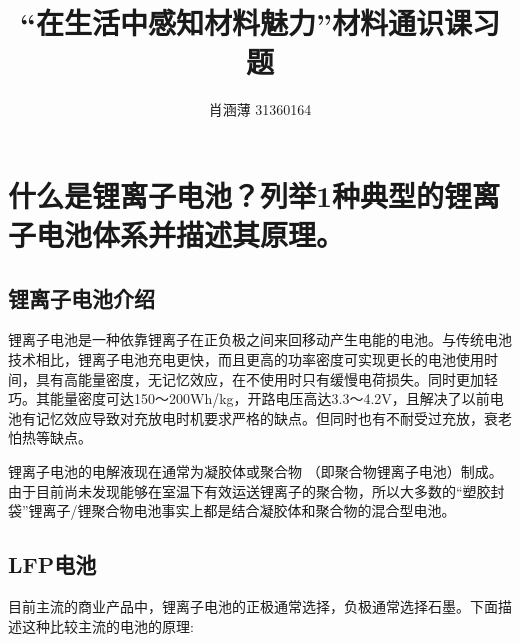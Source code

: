 \documentclass[UTF8,9pt]{ctexart}
\author{肖涵薄 31360164}
\title{“在生活中感知材料魅力”材料通识课习题}
\newcommand\se{\section}                                               %
\newcommand\sub{\subsection}                                           %
\begin{document}
 
\maketitle
\se{什么是锂离子电池？列举1种典型的锂离子电池体系并描述其原理。}
\sub{锂离子电池介绍}
锂离子电池是一种依靠锂离子在正负极之间来回移动产生电能的电池。与传统电池技术相比，锂离子电池充电更快，而且更高的功率密度可实现更长的电池使用时间，具有高能量密度，无记忆效应，在不使用时只有缓慢电荷损失。同时更加轻巧。其能量密度可达150～200Wh/kg\cite{2}，开路电压高达3.3～4.2V，且解决了以前电池有记忆效应导致对充放电时机要求严格的缺点。但同时也有不耐受过充放，衰老怕热等缺点。

锂离子电池的电解液现在通常为凝胶体或聚合物 （即聚合物锂离子电池）制成。由于目前尚未发现能够在室温下有效运送锂离子的聚合物，所以大多数的“塑胶封袋”锂离子/锂聚合物电池事实上都是结合凝胶体和聚合物的混合型电池。
\sub{LFP电池}
目前主流的商业产品中，锂离子电池的正极通常选择，负极通常选择石墨。下面描述这种比较主流的电池的原理:
\end{document}
